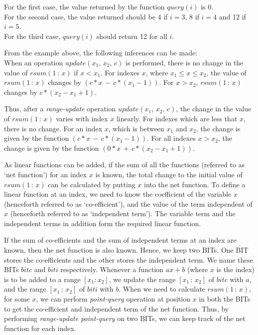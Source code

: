 \documentclass[a4paper]{article}
\begin{document}
\vspace{1 mm}
\noindent
For the first case, the value returned by the function $query(i)$ is $0$.\\
For the second case, the value returned should be 4 if $i=3$, 8 if $i=4$ and 12 if $i=5$.\\
For the third case, $query(i)$ should return 12 for all $i$.

\vspace{2 mm}
From the example above, the following inferences can be made:\\
When an operation $update(x_1,\, x_2,\, c)$ is performed, there is no change in the value of $rsum(1\, : \,x)$ if  $x < x_1$. For indexes $x$, where $x_1 \leq x \leq x_2$, the value of $rsum(1\, : \,x)$ changes by $(c*x\,-\,c*(x_1-1))$. For $x > x_2$, $rsum(1\, : \,x)$ changes by $c*(x_2-x_1+1)$.

\vspace{2 mm}
Thus, after a \textit{range-update} operation $update(x_1,\, x_2,\, c)$, the change in the value of $rsum(1\, : \,x)$ varies with index $x$ linearly. For indexes which are less that $x$, there is no change. For an index $x$, which is between $x_1$ and $x_2$, the change is given by the function $(c*x\,-\,c*(x_1-1))$. For all indexes $x > x_2$, the change is given by the function $(0*x\,+\,c*(x_2-x_1+1))$.

\vspace{2 mm}
As linear functions can be added, if the sum of all the functions (referred to as `net function') for an index $x$ is known, the total change to the initial value of $rsum(1\, : \,x)$ can be calculated by putting $x$ into the net function. To define a linear function at an index, we need to know the coefficient of the variable $x$ (henceforth referred to as `co-efficient'), and the value of the term independent of $x$ (henceforth referred to as `independent term'). The variable term and the independent terms in addition form the required linear function.

\vspace{2 mm}
If the sum of co-efficients and the sum of independent terms at an index are known, then the net function is also known. Hence, we keep two BITs. One BIT stores the co-efficients and the other stores the independent term. We name these BITs $bitc$ and $biti$ respectively. Whenever a function $ax + b$ (where $x$ is the index) is to be added to a range $[x_1 : x_2]$, we update the range $[x_1\, :\, x_2]$ of $bitc$ with $a$, and the range $[x_1\, :\, x_2]$ of $biti$ with $b$. When we need to calculate $rsum(1\, : \,x)$, for some $x$, we can perform \textit{point-query} operation at position $x$ in both the BITs to get the co-efficient and independent term of the net function.
Thus, by performing \textit{range-update point-query} on two BITs, we can keep track of the net function for each index.
\end{document}
